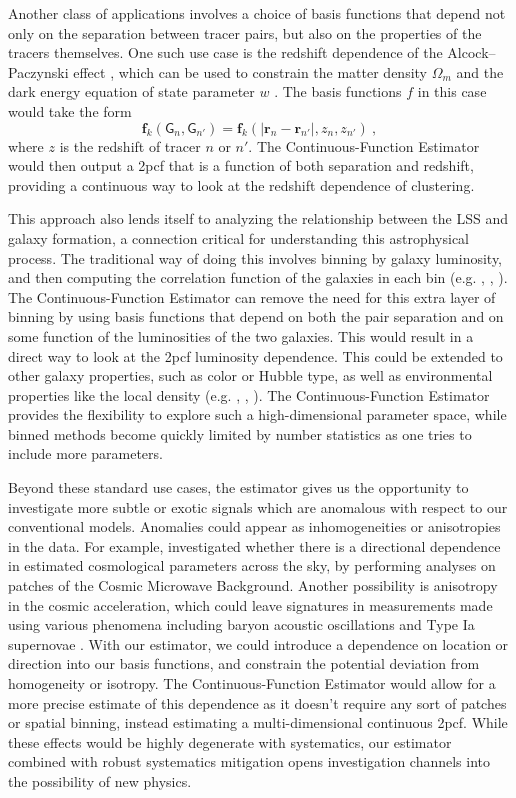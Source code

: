 \documentclass[modern]{aastex62}
\newcommand{\cf}{2pcf\xspace} %
\newcommand{\Est}{The Continuous-Function Estimator\xspace}
\newcommand{\bld}[1]{\bm{#1}} %
\newcommand{\ff}{\bld{f}}
\newcommand{\GG}[1]{\mathsf{G}_{#1}}
\begin{document}
Another class of applications involves a choice of basis functions that depend not only on the separation between tracer pairs, but also on the properties of the tracers themselves.
One such use case is the redshift dependence of the Alcock--Paczynski effect \citep{AlcockPaczynski1979}, which can be used to constrain the matter density $\Omega_m$ and the dark energy equation of state parameter $w$ \citep{Li2016}.
The basis functions $f$ in this case would take the form
\begin{equation}
    \ff_k(\GG{n}, \GG{n'}) = \ff_k(|\bld{r}_n - \bld{r}_{n'}|, z_n, z_{n'}) ~,
\end{equation}
where $z$ is the redshift of tracer $n$ or $n'$.
\Est would then output a \cf that is a function of both separation and redshift, providing a continuous way to look at the redshift dependence of clustering.

This approach also lends itself to analyzing the relationship between the LSS and galaxy formation, a connection critical for understanding this astrophysical process.
The traditional way of doing this involves binning by galaxy luminosity, and then computing the correlation function of the galaxies in each bin (e.g. \citealt{Budavari2003}, \citealt{Zehavi2011}, \citealt{Durkalec2018}).
\Est can remove the need for this extra layer of binning by using basis functions that depend on both the pair separation and on some function of the luminosities of the two galaxies.
This would result in a direct way to look at the \cf luminosity dependence.
This could be extended to other galaxy properties, such as color or Hubble type, as well as environmental properties like the local density (e.g. \citealt{Li2006}, \citealt{Abbas2006}, \citealt{Skibba2014}).
\Est provides the flexibility to explore such a high-dimensional parameter space, while binned methods become quickly limited by number statistics as one tries to include more parameters.

Beyond these standard use cases, the estimator gives us the opportunity to investigate more subtle or exotic signals which are anomalous with respect to our conventional models.
Anomalies could appear as inhomogeneities or anisotropies in the data.
For example, \cite{MukherjeeWandelt2018} investigated whether there is a directional dependence in estimated cosmological parameters across the sky, by performing analyses on patches of the Cosmic Microwave Background.
Another possibility is anisotropy in the cosmic acceleration, which could leave signatures in measurements made using various phenomena including baryon acoustic oscillations \citep{Faltenbacher2012} and Type Ia supernovae \citep{Colin2019}.
With our estimator, we could introduce a dependence on location or direction into our basis functions, and constrain the potential deviation from homogeneity or isotropy.
\Est would allow for a more precise estimate of this dependence as it doesn't require any sort of patches or spatial binning, instead estimating a multi-dimensional continuous \cf.
While these effects would be highly degenerate with systematics, our estimator combined with robust systematics mitigation opens investigation channels into the possibility of new physics.
\end{document}

